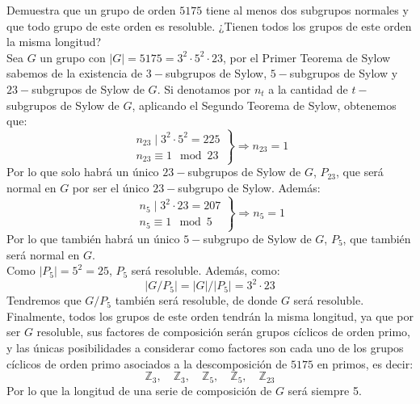 \documentclass[12pt]{article}
\begin{document}
    \begin{ejercicio}[2.5 puntos]
        Demuestra que un grupo de orden $5175$ tiene al menos dos subgrupos normales y que todo grupo de este orden es resoluble. ¿Tienen todos los grupos de este orden la misma longitud?\\

        \noindent
        Sea $G$ un grupo con $|G| = 5175 = 3^2 \cdot 5^2 \cdot 23$, por el Primer Teorema de Sylow sabemos de la existencia de $3-$subgrupos de Sylow, $5-$subgrupos de Sylow y $23-$subgrupos de Sylow de $G$. Si denotamos por $n_t$ a la cantidad de $t-$subgrupos de Sylow de $G$, aplicando el Segundo Teorema de Sylow, obtenemos que:
        \begin{equation*}
            \left.\begin{array}{r}
                n_{23} \mid 3^2 \cdot 5^2 = 225 \\
                n_{23} \equiv 1 \mod 23
            \end{array}\right\} \Longrightarrow n_{23} = 1
        \end{equation*}
        Por lo que solo habrá un único $23-$subgrupos de Sylow de $G$, $P_{23}$, que será normal en $G$ por ser el único $23-$subgrupo de Sylow. Además:
        \begin{equation*}
            \left.\begin{array}{r}
                n_5 \mid 3^2 \cdot 23 = 207 \\
                n_5 \equiv 1 \mod 5
            \end{array}\right\} \Longrightarrow n_5 = 1
        \end{equation*}
        Por lo que también habrá un único $5-$subgrupo de Sylow de $G$, $P_5$, que también será normal en $G$.\\

        \noindent
        Como $|P_5| = 5^2 = 25$, $P_5$ será resoluble. Además, como:
        \begin{equation*}
            |G/P_5| = |G|/|P_5| = 3^2\cdot 23
        \end{equation*}
        Tendremos que $G/P_5$ también será resoluble, de donde $G$ será resoluble.\\

        \noindent
        Finalmente, todos los grupos de este orden tendrán la misma longitud, ya que por ser $G$ resoluble, sus factores de composición serán grupos cíclicos de orden primo, y las únicas posibilidades a considerar como factores son cada uno de los grupos cíclicos de orden primo asociados a la descomposición de $5175$ en primos, es decir:
        \begin{equation*}
            \mathbb{Z}_3, \quad \mathbb{Z}_3, \quad \mathbb{Z}_5, \quad \mathbb{Z}_5, \quad \mathbb{Z}_{23}
        \end{equation*}
        Por lo que la longitud de una serie de composición de $G$ será siempre 5.
    \end{ejercicio}
\end{document}
